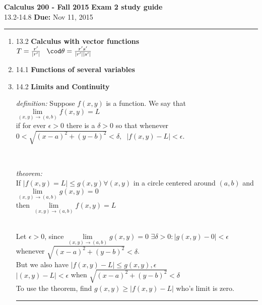 \documentclass[11pt]{article}
\newenvironment{proof}{{\bf Proof:  }}{\hfill\rule{2mm}{2mm}}
\newcommand{\hwheadings}[3]{
{\bf Calculus 200 -  Fall 2015} \hfill {{\bf Exam 2 study guide}}\\
{{\bf } #2} \hfill {{\bf Due:} #3} \\
\rule[0.1in]{\textwidth}{0.025in}
}
\begin{document}
\hwheadings{4}{13.2-14.8}{Nov 11, 2015}

\begin{enumerate}

\item 13.2 \textbf{Calculus with vector functions}
\\
$T = \frac{r'}{|r'|} \; \; \; \cod \theta= \frac{r' s'}{|r'||s'|}$
\\





\item 14.1  \textbf{Functions of several variables}




\item 14.2 \textbf{Limits and Continuity}
\\
\begin{center}
\textit{definition:} Suppose $f(x,y)$ is a function. We say that
\\
$\lim \limits_{(x,y) \to (a,b)} f(x,y)=L$
\\
if for ever $ \epsilon > 0$ there is a $\delta > 0$ so that whenever $0< \sqrt{(x-a)^2+(y-b)^2}<\delta, \; \; |f(x,y)-L|< \epsilon$.
\end{center}

\\
\begin{center}
\textit{theorem:}
\\
If $|f(x,y)=L| \le g(x,y) \forall (x,y)$ in a circle centered around $(a,b)$ and 
\\
$\lim \limits_{(x,y) \to (a,b)} g(x,y)=0$
\\
then $\lim \limits_{(x,y) \to (a,b)} f(x,y)=L$


\end{center}
\\
\begin{proof}
Let $\epsilon >0$, since 
$\lim \limits_{(x,y) \to (a,b)} g(x,y)=0$
$\exists \delta >0 : |g(x,y)-0|<\epsilon$ whenever
$\sqrt{(x-a)^2+(y-b)^2}< \delta$.
\\
But we also have $|f(x,y)-L| \le g(x,y) , \epsilon$
\\
$|(x,y)-L|< \epsilon$ when $\sqrt{(x-a)^2+(y-b)^2}< \delta$
\\
To use the theorem, find $g(x,y) \ge |f(x,y)-L|$ who's limit is zero.
\\
\end{proof}


\end{enumerate}
\end{document}
